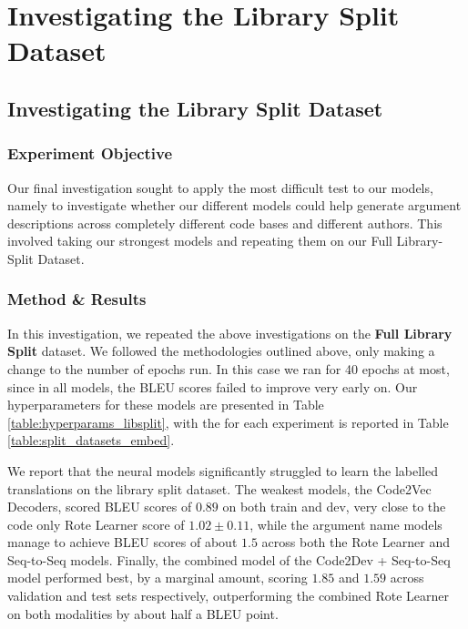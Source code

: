 \section{Investigating the Library Split Dataset} %
\label{sec:analysis}

\subsection{Investigating the Library Split Dataset} %

\subsubsection{Experiment Objective} %

Our final investigation sought to apply the most difficult test to our models, namely to investigate whether our different models could help generate argument descriptions across completely different code bases and different authors.
This involved taking our strongest models and repeating them on our Full Library-Split Dataset.

\subsubsection{Method \& Results}  %

In this investigation, we repeated the above investigations on the \textbf{Full Library Split} dataset. 
We followed the methodologies outlined above, only making a change to the number of epochs run.
In this case we ran for 40 epochs at most, since in all models, the BLEU scores failed to improve very early on. 
Our hyperparameters for these models are presented in Table \ref{table:hyperparams_libsplit}, with the for each experiment is reported in Table \ref{table:split_datasets_embed}.

We report that the neural models significantly struggled to learn the labelled translations on the library split dataset.
The weakest models, the Code2Vec Decoders, scored BLEU scores of $0.89$ on both train and dev, very close to the code only Rote Learner score of   $ 1.02 \pm  0.11$, while the argument name models manage to achieve BLEU scores of about $1.5$ across both the Rote Learner and Seq-to-Seq models. 
Finally, the combined model of the Code2Dev + Seq-to-Seq model performed best, by a marginal amount, scoring  $ 1.85 $ and $ 1.59 $ across validation and test sets respectively,  outperforming the combined Rote Learner on both modalities by about half a BLEU point.



